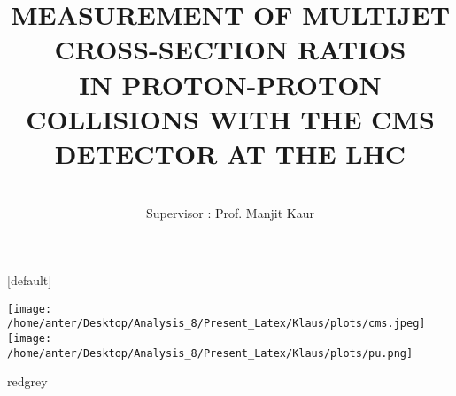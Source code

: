 \documentclass{beamer}
\title[Multijet Cross-Section Ratios(Ph.D. Defense)] {\normalsize MEASUREMENT OF MULTIJET CROSS-SECTION RATIOS \\IN PROTON-PROTON COLLISIONS WITH THE CMS \\DETECTOR AT THE LHC}
\author[Anterpreet Kaur]{\blue{Anterpreet Kaur} \\ { \normalsize Supervisor : Prof. Manjit Kaur}\\}
\institute[]
{
 Department of Physics \\ Panjab University \\ Chandigarh, India
}
\date[October, 2018]{\footnotesize \textcolor{blue!0!black}{}}
\begin{document}
[default]

\begin{frame}[plain]
\vspace{0.50mm}
\texttt{[image: /home/anter/Desktop/Analysis\_8/Present\_Latex/Klaus/plots/cms.jpeg]}
\hfill
\hspace{50 mm}
\texttt{[image: /home/anter/Desktop/Analysis\_8/Present\_Latex/Klaus/plots/pu.png]}
\vspace{0.2mm}
\titlepage
\vspace{2.2mm}
\begin{beamercolorbox}[wd=120mm,ht=1.5mm,center,shadow=true, rounded=true]{redgrey}
{}
{\scriptsize {}}
\end{beamercolorbox}
\end{frame}
\end{document}
